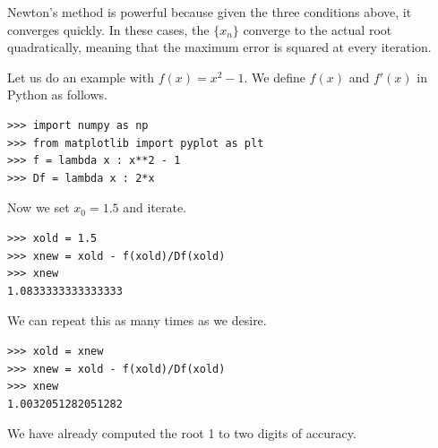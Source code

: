 Newton's method is powerful because given the three conditions above, it converges quickly.
In these cases, the $\{x_n\}$ converge to the actual root quadratically, meaning that the maximum error is squared at every iteration.

Let us do an example with $f(x) = x^2-1$. 
We define $f(x)$ and $f'(x)$ in Python as follows. 
\begin{lstlisting}
>>> import numpy as np
>>> from matplotlib import pyplot as plt
>>> f = lambda x : x**2 - 1
>>> Df = lambda x : 2*x
\end{lstlisting}
Now we set $x_0 = 1.5$ and iterate.
\begin{lstlisting}
>>> xold = 1.5
>>> xnew = xold - f(xold)/Df(xold)
>>> xnew
1.0833333333333333
\end{lstlisting}
We can repeat this as many times as we desire.
\begin{lstlisting}
>>> xold = xnew
>>> xnew = xold - f(xold)/Df(xold)
>>> xnew
1.0032051282051282
\end{lstlisting}
We have already computed the root 1 to two digits of accuracy.


